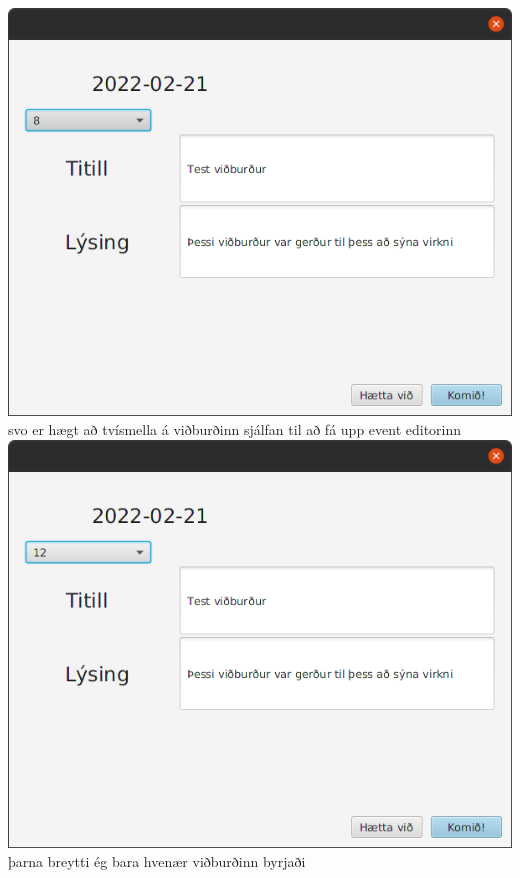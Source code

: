 \documentclass{article}
\begin{document}
\begin{center}
    \includegraphics[scale=0.3]{imgs/s8.png}\\
    svo er hægt að tvísmella á viðburðinn sjálfan til að fá upp event editorinn\\
    \includegraphics[scale=0.3]{imgs/s9.png}\\
    þarna breytti ég bara hvenær viðburðinn byrjaði\\

\end{center}
\end{document}
